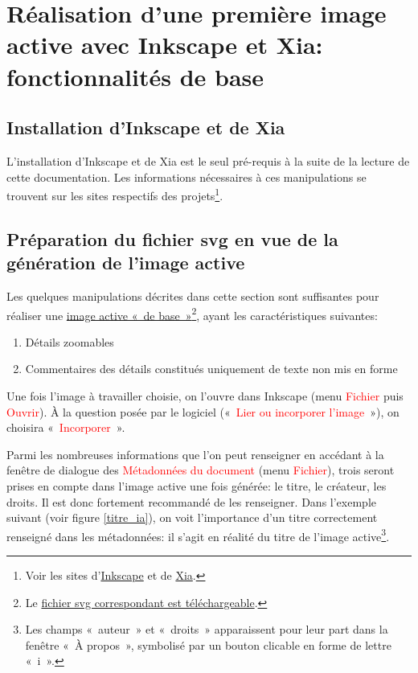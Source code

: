 \documentclass[a4paper,12pt]{report}
\newcommand{\chemin}[1]{\textcolor{red}{#1}}
\begin{document}
\section{Réalisation d'une première image active avec Inkscape et Xia: fonctionnalités de base}

\subsection{Installation d'Inkscape et de Xia}

L'installation d'Inkscape et de Xia est le seul pré-requis à la suite de la lecture de cette documentation.
Les informations nécessaires à ces manipulations se trouvent sur les sites respectifs des projets\footnote{Voir les sites d'\href{http://www.inkscape.org/}{Inkscape} et de \href{http://images-actives.crdp-versailles.fr/beta/}{Xia}.}.

\subsection{Préparation du fichier svg en vue de la génération de l'image active}

Les quelques manipulations décrites dans cette section sont suffisantes
pour réaliser une \href{http://geoffrey-gekiere.ac-versailles.fr/xia1}{image active «~de base~»}\footnote{Le \href{http://geoffrey-gekiere.ac-versailles.fr/xia1/svg/xia1.svg}{fichier svg correspondant est téléchargeable}.}, ayant les caractéristiques suivantes:
\begin{enumerate}
 \item Détails zoomables
 \item Commentaires des détails constitués uniquement de texte non mis en forme
\end{enumerate}


Une fois l'image à travailler choisie, on l'ouvre dans Inkscape (menu \chemin{Fichier} puis \chemin{Ouvrir}).
À la question posée par le logiciel («~\chemin{Lier ou incorporer l'image}~»), on choisira «~\chemin{Incorporer}~».

Parmi les nombreuses informations que l'on peut renseigner en accédant à la fenêtre de dialogue des 
\chemin{Métadonnées du document} (menu \chemin{Fichier}), trois seront prises en compte dans l'image active
une fois générée: le titre, le créateur, les droits.
Il est donc fortement recommandé de les renseigner.
Dans l'exemple suivant (voir figure \ref{titre_ia}), on voit l'importance d'un titre correctement
renseigné dans les métadonnées: il s'agit en réalité du titre de l'image active\footnote{Les champs «~auteur~» et «~droits~» apparaissent pour leur part dans la fenêtre «~À propos~», symbolisé par un bouton clicable en forme de lettre «~i~».}.
\end{document}
